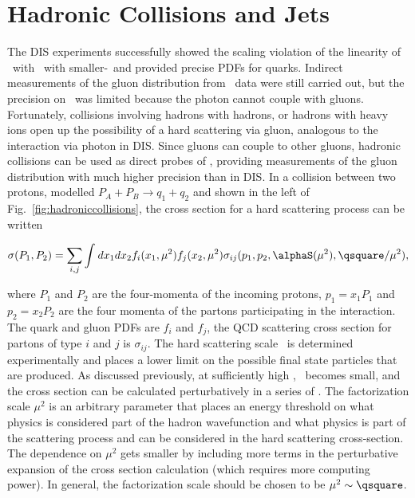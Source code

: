 
\FloatBarrier

\section{ Hadronic Collisions and Jets }

The DIS experiments successfully showed the scaling violation of the linearity of \ftwo\ with \qsquare\ with smaller-\xb\ and provided precise PDFs for quarks. Indirect measurements of the gluon distribution from \ftwo\ data were still carried out, but the precision on \gx\ was limited because the photon cannot couple with gluons. Fortunately, collisions involving hadrons with hadrons, or hadrons with heavy ions open up the possibility of a hard scattering via gluon, analogous to the interaction via photon in DIS. Since gluons can couple to other gluons, hadronic collisions can be used as direct probes of \gx, providing measurements of the gluon distribution with much higher precision than in DIS. In a collision between two protons, modelled $P_{A} + P_{B} \rightarrow q_{1} + q_{2}$ and shown in the left of Fig.~\ref{fig:hadroniccollisions}, the cross section for a hard scattering process can be written~\cite{qcdbook}

\begin{equation}
\sigma(P_{1}, P_{2}) = \sum_{i,j}^{}\int_{}^{}dx_{1}dx_{2}f_{i}(x_{1},\mu^{2})f_{j}(x_{2},\mu^{2})\sigma_{ij}(p_{1},p_{2},\alphaS(\mu^2), \qsquare/\mu^{2}),
\end{equation}

where $P_{1}$ and $P_{2}$ are the four-momenta of the incoming protons, $p_{1}=x_{1}P_{1}$ and $p_{2}=x_{2}P_{2}$ are the four momenta of the partons participating in the interaction. The quark and gluon PDFs are $f_{i}$ and $f_{j}$, the QCD scattering cross section for partons of type $i$ and $j$ is $\sigma_{ij}$. The hard scattering scale \qsquare\ is determined experimentally and places a lower limit on the possible final state particles that are produced. As discussed previously, at sufficiently high \qsquare, \alphaS\ becomes small, and the cross section can be calculated perturbatively in a series of \alphaS. The factorization scale $\mu^{2}$ is an arbitrary parameter that places an energy threshold on what physics is considered part of the hadron wavefunction and what physics is part of the scattering process and can be considered in the hard scattering cross-section. The dependence on $\mu^{2}$ gets smaller by including more terms in the perturbative expansion of the cross section calculation (which requires more computing power). In general, the factorization scale should be chosen to be $\mu^{2} \sim \qsquare$. 

